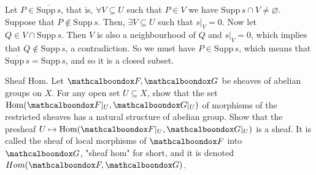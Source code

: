 \begin{sol}
	Let $P \in \overline{\mathrm{Supp} \, s}$, that is, $\forall V \subseteq U$ such that $P \in V$ we have $\mathrm{Supp} \, s \cap V \neq \varnothing$. Suppose that $P \notin \mathrm{Supp} \, s$. Then, $\exists V \subseteq U$ such that $s|_V = 0$. Now let $Q \in V \cap \mathrm{Supp} \, s$. Then $V$ is also a neighbourhood of $Q$ and $s|_V = 0$, which implies that $Q \notin \mathrm{Supp} \, s$, a contradiction. So we must have $P \in \mathrm{Supp} \, s$, which means that $\overline{\mathrm{Supp} \, s} = \mathrm{Supp} \, s$, and so it is a closed subset. 
\end{sol}

\begin{ex}
	Sheaf Hom. Let $\sF, \sG$ be sheaves of abelian groups on $X$. For any open set $U \subseteq X$, show that the set $\mathrm{Hom}(\sF|_U, \sG|_U)$ of morphisms of the restricted sheaves has a natural structure of abelian group. Show that the presheaf $U \mapsto \mathrm{Hom}(\sF|_U, \sG|_U)$ is a sheaf. It is called the sheaf of local morphisms of $\sF$ into $\sG$, "sheaf hom" for short, and it is denoted $Hom(\sF, \sG)$.
\end{ex}

